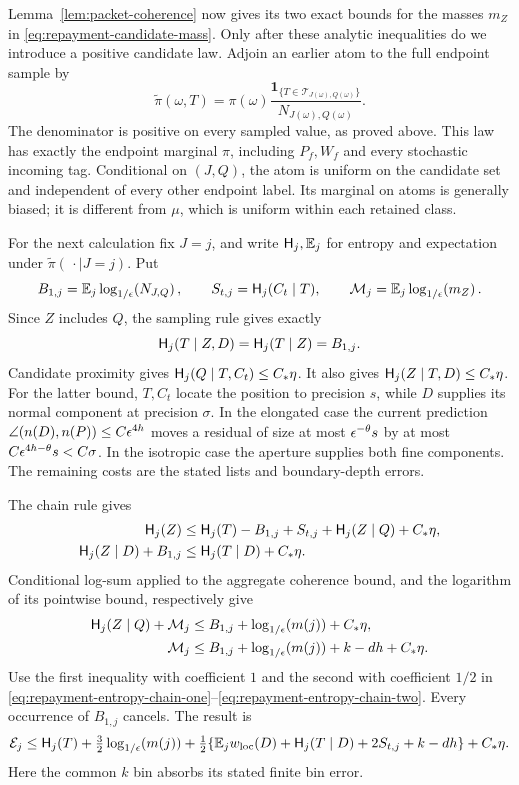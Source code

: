 Lemma~\ref{lem:packet-coherence} now gives its two exact bounds for
the masses \(m_Z\) in \eqref{eq:repayment-candidate-mass}.
Only after these analytic inequalities do we introduce a positive
candidate law.  Adjoin an earlier atom to the full endpoint sample by
\begin{equation}
 \widetilde\pi(\omega,T)=\pi(\omega)
   \frac{\boldsymbol1_{\{T\in\mathcal T_{J(\omega),Q(\omega)}\}}}
        {N_{J(\omega),Q(\omega)}} .
 \label{eq:repayment-candidate-law}
\end{equation}
The denominator is positive on every sampled value, as proved above.
This law has exactly the endpoint marginal \(\pi\), including
\(P_f,W_f\) and every stochastic incoming tag.  Conditional on
\((J,Q)\), the atom is uniform on the candidate set and independent
of every other endpoint label.  Its marginal on atoms is generally
biased; it is different from \(\mu\), which is uniform within each
retained class.

For the next calculation fix \(J=j\), and write \(\mathsf H_j,\mathbb E_j\)
for entropy and expectation under
\(\widetilde\pi(\,\cdot\mid J=j)\).  Put
\[
 B_{1,j}=\mathbb E_j\log_{1/\epsilon}\!\left(N_{J,Q}\right),\qquad
 S_{t,j}=\mathsf H_j(C_t\mid T),\qquad
 \mathcal M_j=\mathbb E_j\log_{1/\epsilon}\!\left(m_Z\right).
\]
Since \(Z\) includes \(Q\), the sampling rule gives exactly
\[
 \mathsf H_j(T\mid Z,D)=\mathsf H_j(T\mid Z)=B_{1,j}.
\]
Candidate proximity gives
\(\mathsf H_j(Q\mid T,C_t)\le C_*\eta\).  It also gives
\(\mathsf H_j(Z\mid T,D)\le C_*\eta\).
For the latter bound, \(T,C_t\) locate the position to precision
\(s\), while \(D\) supplies its normal component at precision
\(\sigma\).  In the elongated case the current prediction
\(\angle(n(D),n(P))\le C\epsilon^{4h}\) moves a residual of size
at most \(\epsilon^{-\theta}s\) by at most
\(C\epsilon^{4h-\theta}s< C\sigma\).
In the isotropic case the aperture supplies both fine components.
The remaining costs are the stated lists and boundary-depth errors.

The chain rule gives
\begin{align}
 \mathsf H_j(Z)&\le \mathsf H_j(T)-B_{1,j}+S_{t,j}
                 +\mathsf H_j(Z\mid Q)+C_*\eta,
 \label{eq:repayment-entropy-chain-one}\\
 \mathsf H_j(Z\mid D)+B_{1,j}
       &\le \mathsf H_j(T\mid D)+C_*\eta.
 \label{eq:repayment-entropy-chain-two}
\end{align}
Conditional log-sum applied to the aggregate coherence bound, and
the logarithm of its pointwise bound, respectively give
\begin{align*}
 \mathsf H_j(Z\mid Q)+\mathcal M_j
     &\le B_{1,j}+\log_{1/\epsilon}\!\left(m(j)\right)+C_*\eta,\\
 \mathcal M_j&\le B_{1,j}+\log_{1/\epsilon}\!\left(m(j)\right)+k-dh+C_*\eta .
\end{align*}
Use the first inequality with coefficient \(1\) and the second
with coefficient \(1/2\) in
\eqref{eq:repayment-entropy-chain-one}--\eqref{eq:repayment-entropy-chain-two}.
Every occurrence of \(B_{1,j}\) cancels.  The result is
\begin{equation}
 \mathcal E_j\le
 \mathsf H_j(T)+\tfrac32\log_{1/\epsilon}\!\left(m(j)\right)
 +\tfrac12\{\mathbb E_jw_{\rm loc}(D)+\mathsf H_j(T\mid D)
                    +2S_{t,j}+k-dh\}+C_*\eta .
 \label{eq:coherent-entropy-repayment}
\end{equation}
Here the common \(k\) bin absorbs its stated finite bin error.

